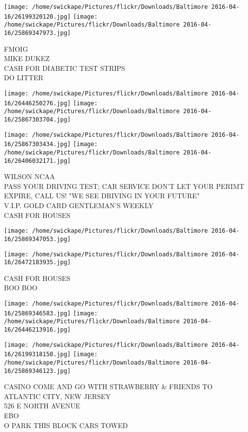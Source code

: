 \documentclass[10pt,letterpaper]{article}
\begin{document}
\texttt{[image: /home/swickape/Pictures/flickr/Downloads/Baltimore 2016-04-16/26199320120.jpg]}
\texttt{[image: /home/swickape/Pictures/flickr/Downloads/Baltimore 2016-04-16/25869347973.jpg]}

FMOIG\\
MIKE DUKEZ\\
CASH FOR DIABETIC TEST STRIPS\\
DO LITTER\\
\pagebreak

\texttt{[image: /home/swickape/Pictures/flickr/Downloads/Baltimore 2016-04-16/26446250276.jpg]}
\texttt{[image: /home/swickape/Pictures/flickr/Downloads/Baltimore 2016-04-16/25867303704.jpg]}

\texttt{[image: /home/swickape/Pictures/flickr/Downloads/Baltimore 2016-04-16/25867303434.jpg]}
\texttt{[image: /home/swickape/Pictures/flickr/Downloads/Baltimore 2016-04-16/26406032171.jpg]}

WILSON NCAA\\
PASS YOUR DRIVING TEST; CAR SERVICE DON'T LET YOUR PERIMT EXPIRE, CALL US!  "WE SEE DRIVING IN YOUR FUTURE"\\
V.I.P. GOLD CARD GENTLEMAN'S WEEKLY\\
CASH FOR HOUSES\\
\pagebreak

\texttt{[image: /home/swickape/Pictures/flickr/Downloads/Baltimore 2016-04-16/25869347053.jpg]}

\vspace{0.25in}
\texttt{[image: /home/swickape/Pictures/flickr/Downloads/Baltimore 2016-04-16/26472183935.jpg]}

CASH FOR HOUSES\\
BOO BOO\\
\pagebreak

\texttt{[image: /home/swickape/Pictures/flickr/Downloads/Baltimore 2016-04-16/25869346583.jpg]}
\texttt{[image: /home/swickape/Pictures/flickr/Downloads/Baltimore 2016-04-16/26446213916.jpg]}

\texttt{[image: /home/swickape/Pictures/flickr/Downloads/Baltimore 2016-04-16/26199318150.jpg]}
\texttt{[image: /home/swickape/Pictures/flickr/Downloads/Baltimore 2016-04-16/25869346123.jpg]}

CASINO COME AND GO WITH STRAWBERRY \& FRIENDS TO ATLANTIC CITY, NEW JERSEY\\
526 E NORTH AVENUE\\
EBO\\
O PARK THIS BLOCK CARS TOWED\\
\pagebreak
\end{document}
